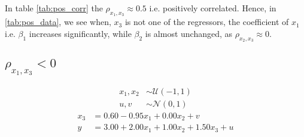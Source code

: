 In table \autoref{tab:pos_corr} the  $\rho _{x_1 , x_3} \approx 0.5$ i.e. positively correlated. Hence, in \autoref{tab:pos_data}, we see when, $x_3$ is not one of the regressors, the coefficient of $x_1$ i.e. $\beta_1$ increases significantly, while $\beta_2$ is almost unchanged, as $\rho_{x_2 , x_3} \approx 0$.



\subsection{$\rho_{x_1 , x_3} < 0$}
\begin{align*}
    x_1 , x_2 &\sim \mathcal{U}(-1 , 1)\\
    u , v &\sim \mathcal{N}(0 , 1)
    \end{align*}
\begin{align*}
    x_3 &= 0.60 - 0.95  x_1 + 0.00x_2 + v\\
    y &= 3.00 +  2.00 x_1 +   1.00 x_2 +  1.50 x_3 + u
\end{align*}

